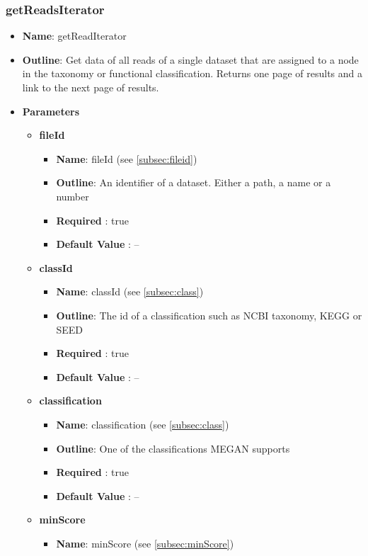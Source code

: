 \documentclass[11pt]{article}
\begin{document}
\subsubsection{getReadsIterator}
\begin{itemize}
	\item \textbf{Name}: getReadIterator
	\item \textbf{Outline}: Get data of all reads of a single dataset that are assigned to a node in the taxonomy or functional classification. Returns one page of results and a link to the next page of results.
	\item \textbf{Parameters}
		\begin{itemize}
			\item \textbf{fileId}		
				\begin{itemize}
					\item \textbf{Name}: fileId (see \ref{subsec:fileid})
					\item \textbf{Outline}: An identifier of a dataset. Either a path, a name or a number
					\item \textbf{Required} : true
					\item \textbf{Default Value} : --
				\end{itemize}
			\item \textbf{classId}		
				\begin{itemize}
					\item \textbf{Name}: classId (see \ref{subsec:class})
					\item \textbf{Outline}: The id of a classification such as NCBI taxonomy, KEGG or SEED
					\item \textbf{Required} : true
					\item \textbf{Default Value} : --
				\end{itemize}
			\item \textbf{classification}		
				\begin{itemize}
					\item \textbf{Name}: classification (see \ref{subsec:class})
					\item \textbf{Outline}: One of the classifications MEGAN supports
					\item \textbf{Required} : true
					\item \textbf{Default Value} : --
				\end{itemize}
			\item \textbf{minScore}		
				\begin{itemize}
					\item \textbf{Name}: minScore (see \ref{subsec:minScore})

\end{itemize}
\end{itemize}
\end{itemize}
\end{document}
